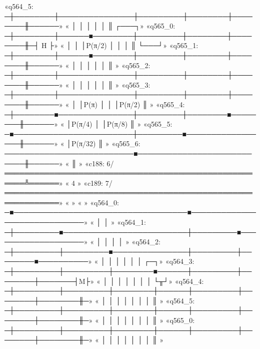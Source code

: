 «q564_5: ─┼────────┼───────────────┼─────────┼────────┼────────╫──────»
«         │        │               │         │        │        ║ ┌───┐»
«q565_0: ─┼────────┼──────■────────┼─────────┼────────┼────────╫─┤ H ├»
«         │        │      │P(π/2)  │         │        │        ║ └───┘»
«q565_1: ─┼────────┼──────■────────┼─────────┼────────┼────────╫──────»
«         │        │               │         │        │        ║      »
«q565_2: ─┼────────┼───────────────┼─────────┼────────┼────────╫──────»
«         │        │               │         │        │        ║      »
«q565_3: ─┼────────┼───────────────┼─────────┼────────┼────────╫──────»
«         │        │P(π)           │         │        │P(π/2)  ║      »
«q565_4: ─┼────────■───────────────┼─────────┼────────■────────╫──────»
«         │P(π/4)                  │         │P(π/8)           ║      »
«q565_5: ─■────────────────────────┼─────────■─────────────────╫──────»
«                                  │P(π/32)                    ║      »
«q565_6: ──────────────────────────■───────────────────────────╫──────»
«                                                              ║      »
«c188: 6/══════════════════════════════════════════════════════╩══════»
«                                                              4      »
«c189: 7/═════════════════════════════════════════════════════════════»
«                                                                     »
«                                                                           »
«q564_0: ─■───────────────────────────────────■─────────────────────────────»
«         │                                   │                             »
«q564_1: ─┼─────────■─────────────────────────┼─────────■───────────────────»
«         │         │                         │         │                   »
«q564_2: ─┼─────────┼─────────■───────────────┼─────────┼────────■──────────»
«         │         │         │               │         │        │       ┌─┐»
«q564_3: ─┼─────────┼─────────┼────────■──────┼─────────┼────────┼───────┤M├»
«         │         │         │        │      │         │        │       └╥┘»
«q564_4: ─┼─────────┼─────────┼────────┼──────┼─────────┼────────┼────────╫─»
«         │         │         │        │      │         │        │        ║ »
«q564_5: ─┼─────────┼─────────┼────────┼──────┼─────────┼────────┼────────╫─»
«         │         │         │        │      │         │        │        ║ »
«q565_0: ─┼─────────┼─────────┼────────┼──────┼─────────┼────────┼────────╫─»
«         │         │         │        │      │         │        │        ║ »
